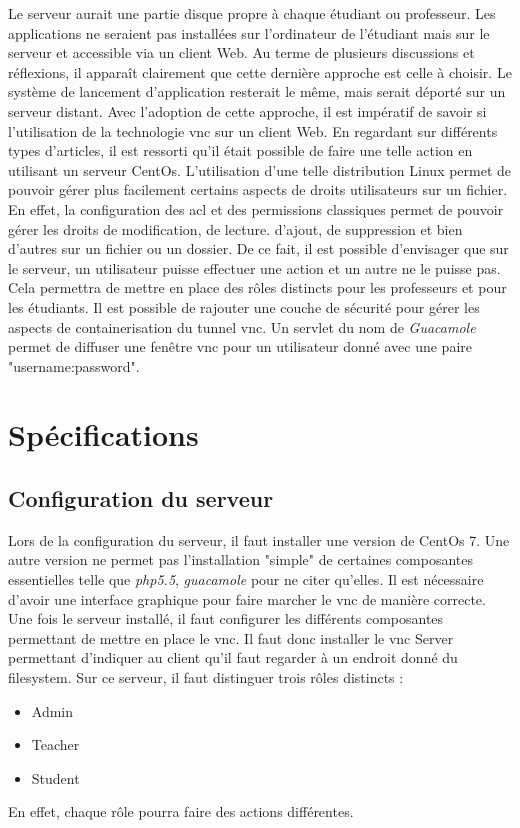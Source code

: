 Le serveur aurait une partie disque propre à chaque étudiant ou professeur.
Les applications ne seraient pas installées sur l'ordinateur de l'étudiant mais sur le serveur et accessible via un client Web.
\newline
Au terme de plusieurs discussions et réflexions, il apparaît clairement que cette dernière approche est celle à choisir.
Le système de lancement d'application resterait le même, mais serait déporté sur un serveur distant.
\newline
Avec l'adoption de cette approche, il est impératif de savoir si l'utilisation de la technologie \acrshort{vnc} sur un client Web.
En regardant sur différents types d'articles, il est ressorti qu'il était possible de faire une telle action en utilisant un serveur CentOs.\cite{vnc}
L'utilisation d'une telle distribution Linux permet de pouvoir gérer plus facilement certains aspects de droits utilisateurs sur un fichier.
En effet, la configuration des \acrfull{acl} et des permissions classiques permet de pouvoir gérer les droits de modification, de lecture. d'ajout, de suppression et bien d'autres sur un fichier ou un dossier.
De ce fait, il est possible d'envisager que sur le serveur, un utilisateur puisse effectuer une action et un autre ne le puisse pas.
Cela permettra de mettre en place des rôles distincts pour les professeurs et pour les étudiants.
\newline
Il est possible de rajouter une couche de sécurité pour gérer les aspects de containerisation du tunnel \acrshort{vnc}.
Un servlet du nom de \textit{Guacamole} permet de diffuser une fenêtre \acrshort{vnc} pour un utilisateur donné avec une paire "username:password".

\section{Spécifications}

\subsection{Configuration du serveur}
Lors de la configuration du serveur, il faut installer une version de CentOs 7.
Une autre version ne permet pas l'installation "simple" de certaines composantes essentielles telle que \textit{php5.5}, \textit{guacamole} pour ne citer qu'elles.
Il est nécessaire d'avoir une interface graphique pour faire marcher le \acrshort{vnc} de manière correcte.
Une fois le serveur installé, il faut configurer les différents composantes permettant de mettre en place le \acrshort{vnc}.
Il faut donc installer le \acrshort{vnc} Server \cite{vncs} permettant d'indiquer au client qu'il faut regarder à un endroit donné du \gls{filesystem}.
Sur ce serveur, il faut distinguer trois rôles distincts :
\begin{itemize}
	\item Admin
	\item Teacher
	\item Student
\end{itemize}
En effet, chaque rôle pourra faire des actions différentes.

